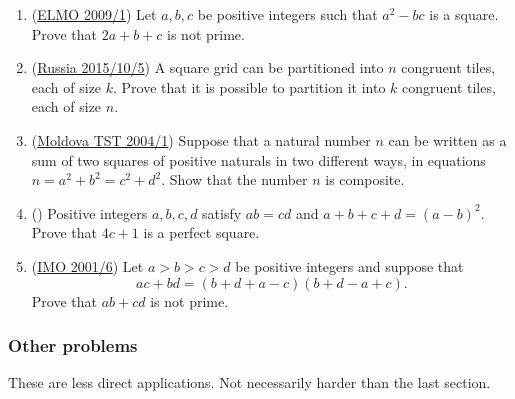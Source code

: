 \documentclass[11pt,paper=letter]{scrartcl}
\begin{document}
\begin{enumerate}

\item (\href{https://artofproblemsolving.com/community/c6h514439p2890146}{ELMO 2009/1}) Let $a, b, c$ be positive integers such that $a^2 - bc$ is a square. Prove that $2a + b + c$ is not prime. \hint{\ref{h:1}}

\item (\href{https://artofproblemsolving.com/community/c6h1126565p5209254}{Russia 2015/10/5}) A square grid can be partitioned into $n$ congruent tiles, each of size $k$. Prove that it is possible to partition it into $k$ congruent tiles, each of size $n$. \hint{\ref{h:2}}

\item (\href{https://artofproblemsolving.com/community/c6h304361p1972907}{Moldova TST 2004/1}) Suppose that a natural number $n$ can be written as a sum of two squares of positive naturals in two different ways, in equations $ n = a^{2} + b^{2} = c^{2} + d^{2} $. Show that the number $n$ is composite. \hint{\ref{h:3}}

\item (\href{https://artofproblemsolving.com/community/c6h3087478p27901399}{\!}) Positive integers $a,b,c,d$ satisfy $ab = cd$ and $a+b+c+d=(a-b)^2.$ Prove that $4c+1$ is a perfect square. \hints{\ref{h:4} \ref{h:5}}

\item (\href{https://artofproblemsolving.com/community/c6h17474p119217}{IMO 2001/6}) Let $a > b > c > d$ be positive integers and suppose that \[ ac + bd = (b+d+a-c)(b+d-a+c). \] Prove that $ab + cd$ is not prime. \hints{\ref{h:6} \ref{h:7}}

\end{enumerate}

\subsubsection*{Other problems}

These are less direct applications. Not necessarily harder than the last section.
\end{document}
